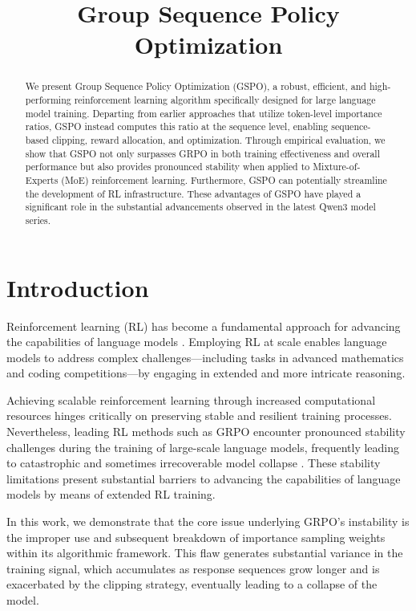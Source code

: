 \title{Group Sequence Policy Optimization}

\begin{abstract}
We present Group Sequence Policy Optimization (GSPO), a robust, efficient, and high-performing reinforcement learning algorithm specifically designed for large language model training. Departing from earlier approaches that utilize token-level importance ratios, GSPO instead computes this ratio at the sequence level, enabling sequence-based clipping, reward allocation, and optimization. Through empirical evaluation, we show that GSPO not only surpasses GRPO in both training effectiveness and overall performance but also provides pronounced stability when applied to Mixture-of-Experts (MoE) reinforcement learning. Furthermore, GSPO can potentially streamline the development of RL infrastructure. These advantages of GSPO have played a significant role in the substantial advancements observed in the latest Qwen3 model series.
\end{abstract}

\section{Introduction}
\label{sec:intro}

Reinforcement learning (RL) has become a fundamental approach for advancing the capabilities of language models \citep{o1,dpsk-r1,qwq32b,qwen3}. Employing RL at scale enables language models to address complex challenges—including tasks in advanced mathematics and coding competitions—by engaging in extended and more intricate reasoning.

Achieving scalable reinforcement learning through increased computational resources hinges critically on preserving stable and resilient training processes. Nevertheless, leading RL methods such as GRPO \citep{grpo} encounter pronounced stability challenges during the training of large-scale language models, frequently leading to catastrophic and sometimes irrecoverable model collapse \citep{qwen3, minimax-m1}. These stability limitations present substantial barriers to advancing the capabilities of language models by means of extended RL training.

In this work, we demonstrate that the core issue underlying GRPO's instability is the improper use and subsequent breakdown of importance sampling weights within its algorithmic framework. This flaw generates substantial variance in the training signal, which accumulates as response sequences grow longer and is exacerbated by the clipping strategy, eventually leading to a collapse of the model.

